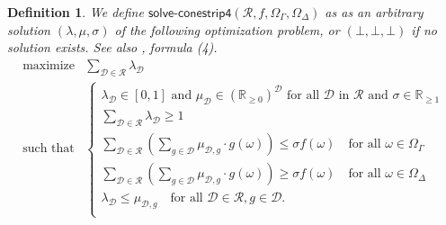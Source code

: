 \documentclass{article}
\theoremstyle{mytheorem}
\newtheorem{definition}[theorem]{Definition}
\newcommand{\func}[1]{\ensuremath{\textsf{#1}}} %
\begin{document}
\begin{definition}
We define $\func{solve-conestrip4}(\mathcal{R}, f, \Omega_\Gamma, \Omega_\Delta)$ 
as as an arbitrary solution $(\lambda, \mu, \sigma)$ of the following optimization problem, or $(\bot,\bot,\bot)$ if no solution exists.
See also \cite{Quaeghebeur2014}, formula (4).
\begin{equation} \label{eq:conestrip4}
\begin{array}{ll}
    \text{maximize} & \sum\limits_{\mathcal{D} \in \mathcal{R}} \lambda_\mathcal{D}
    \\ [0.5cm]
    \text{such that} & 

    \left\{
    \begin{array}{ll}
         \lambda_\mathcal{D} \in [0,1] \text{ and } \mu_\mathcal{D} \in (\mathbb{R}_{\geq 0})^\mathcal{D} \text{ for all } \mathcal{D} \text{ in } \mathcal{R} \text{ and } \sigma \in \mathbb{R}_{\geq 1} \\ [0.2cm]

         \sum\limits_{\mathcal{D} \in \mathcal{R}} \lambda_\mathcal{D} \geq 1 \\ [0.5cm]
         
         \sum\limits_{\mathcal{D} \in \mathcal{R}}
         (
         \sum\limits_{g \in \mathcal{D}} \mu_{\mathcal{D},g} \cdot g(\omega)
         )
          \leq \sigma f(\omega)
         \quad \text{for all } \omega \in \Omega_\Gamma \\ [0.5cm] 
         
         \sum\limits_{\mathcal{D} \in \mathcal{R}}
         (
         \sum\limits_{g \in \mathcal{D}} \mu_{\mathcal{D},g} \cdot g(\omega)
         )
          \geq \sigma f(\omega)
         \quad \text{for all } \omega \in \Omega_\Delta \\ [0.5cm]
         
         \lambda_\mathcal{D} \leq \mu_{\mathcal{D},g}
         \quad \text{for all } \mathcal{D} \in \mathcal{R}, g \in \mathcal{D}. \\
    \end{array}
    \right.
\end{array}
\end{equation}

\end{definition}
\end{document}
